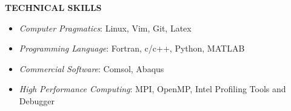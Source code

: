 \documentclass[12pt, letterpaper]{article}
\begin{document}
\textbf{TECHNICAL SKILLS}

\fullrule

\begin{itemize}[leftmargin=*, labelsep=3mm, itemsep=2pt, topsep=0pt]
   \item \textit{Computer Pragmatics}: Linux, Vim, Git, Latex
   \item \textit{Programming Language}: Fortran, c/c++, Python, MATLAB
   \item \textit{Commercial Software}: Comsol, Abaqus
   \item \textit{High Performance Computing}: MPI, OpenMP, Intel Profiling Tools and Debugger
\end{itemize}
\end{document}
